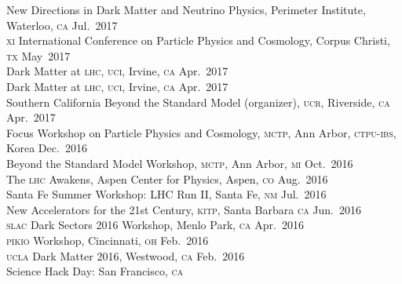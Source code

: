 \documentclass[margin,line]{resume}
\newcommand{\scap}[1]{\textsc{\MakeLowercase{#1}}}
\begin{document}
\begin{resume}
New Directions in Dark Matter and Neutrino Physics, Perimeter Institute, Waterloo, \scap{CA}
\hfill %
Jul.~2017\vspace{.7mm}\\   
%
\scap{XI} International Conference on Particle Physics and Cosmology, Corpus Christi, \scap{TX}
\hfill May~2017\vspace{.7mm}\\   
Dark Matter at \scap{LHC}, \scap{UCI}, Irvine, \scap{CA}
\hfill Apr.~2017\vspace{.7mm}\\   
%
Dark Matter at \scap{LHC}, \scap{UCI}, Irvine, \scap{CA}
\hfill Apr.~2017\vspace{.7mm}\\   
%
Southern California Beyond the Standard Model (organizer), \scap{UCR}, Riverside, \scap{CA}
\hfill Apr.~2017\vspace{.7mm}\\   
%
Focus Workshop on Particle Physics and Cosmology, \scap{MCTP}, Ann Arbor, \scap{CTPU-IBS}, Korea
\hfill Dec.~2016\vspace{.7mm}\\   
%
Beyond the Standard Model Workshop, \scap{MCTP}, Ann Arbor, \scap{MI}
\hfill Oct.~2016\vspace{.7mm}\\   
%
The \scap{LHC} Awakens, Aspen Center for Physics, Aspen, \scap{CO}
\hfill Aug.~2016\vspace{.7mm}\\   
%
Santa Fe Summer Workshop: LHC Run II, Santa Fe, \scap{NM}
\hfill
Jul.~2016\vspace{.7mm}\\   
% 
New Accelerators for the 21st Century, \scap{KITP}, Santa Barbara \scap{CA}
\hfill 
Jun.~2016\vspace{.7mm}\\   
%
\scap{SLAC} Dark Sectors 2016 Workshop, Menlo Park, \scap{CA}
\hfill 
Apr.~2016\vspace{.7mm}\\   
%
\scap{PIKIO} Workshop, Cincinnati, \scap{OH}
\hfill 
Feb.~2016\vspace{.7mm}\\   
%
\scap{UCLA} Dark Matter 2016, Westwood, \scap{CA}
\hfill 
Feb.~2016\vspace{.7mm}\\   
%
Science Hack Day: San Francisco, \scap{CA}

\end{resume}
\end{document}
